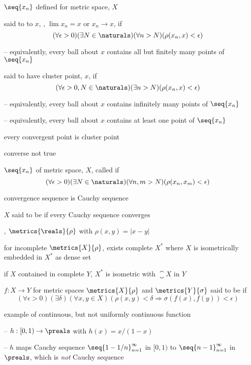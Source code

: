 \documentclass[17pt,landscape]{foils}
\begin{document}
{{\bit
	\item $\seq{x_n}$ defined for metric space, $X$

	\bit
		\item said to  to $x$, \ie, $\lim x_n =x$ or $x_n \to x$, if
		\[
			(\forall \epsilon>0)(\exists N\in\naturals)(\forall n> N)(\rho(x_n,x)<\epsilon)
		\]
		\bit
			\item [--] equivalently, every ball about $x$ contains all but finitely many points of $\seq{x_n}$
		\eit

		\vitem said to have cluster point, $x$, if
		\[
			(\forall \epsilon>0, N\in\naturals)(\exists n> N)(\rho(x_n,x)<\epsilon)
		\]
		\bit
			\item [--] equivalently, every ball about $x$ contains infinitely many points of $\seq{x_n}$
			\item [--] equivalently, every ball about $x$ contains at least one point of $\seq{x_n}$
		\eit
	\eit

	\vitem every convergent point is cluster point
	\bit
		\item converse not true
	\eit
\eit



\bit
	\item $\seq{x_n}$ of metric space, $X$, called  if
	\[
		(\forall \epsilon>0)(\exists N\in\naturals)(\forall n,m> N)(\rho(x_n,x_m)<\epsilon)
	\]

	\vitem convergence sequence is Cauchy sequence

	\vitem $X$ said to be  if every Cauchy sequence converges%
	\bit
		\item \eg, $\metrics{\reals}{\rho}$ with $\rho(x,y)=|x-y|$
	\eit

	\vitem for incomplete $\metrics{X}{\rho}$, exists complete $X^\ast$
		where $X$ is isometrically embedded in $X^\ast$ as dense set

	\vitem if $X$ contained in complete $Y$,
		$X^\ast$ is isometric with $\closure{X}$ in $Y$
\eit



\bit
	\item $f:X\to Y$ for metric spaces $\metrics{X}{\rho}$ and $\metrics{Y}{\sigma}$
		said to be  if
		\[
			(\forall \epsilon>0)(\exists \delta)(\forall x,y \in X)(\rho(x,y) < \delta \Rightarrow \sigma(f(x),f(y))<\epsilon)
		\]
	\bit
		\item example of continuous, but not uniformly continuous function
		\bit
			\item [--] $h:[0,1)\to\preals$ with $h(x)=x/(1-x)$
			\item [--] $h$ maps Cauchy sequence $\seq{1-1/n}_{n=1}^\infty$ in $[0,1)$
				to $\seq{n-1}_{n=1}^\infty$ in $\preals$, which is \emph{not} Cauchy sequence
		\eit
	\eit

}}
\end{document}
